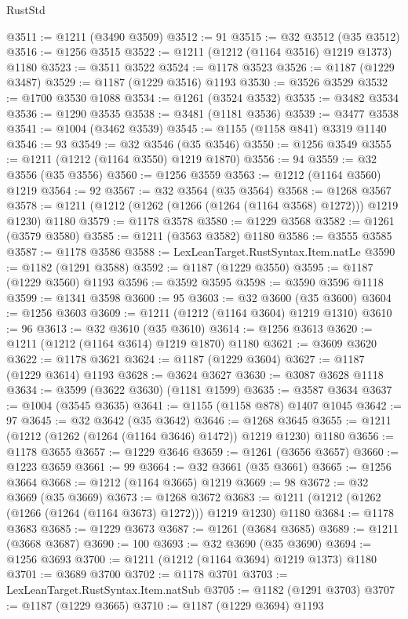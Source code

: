 \begin{lexlean}{RustStd}
\begin{coremodule}
{\begin{coremodule}
{{{{{{{{{{{{{{{{{{{{{{{{{{{{{{{{@3511 := @1211 (@3490 @3509)
@3512 := 91
@3515 := @32 @3512 (@35 @3512)
@3516 := @1256 @3515
@3522 := @1211 (@1212 (@1164 @3516) @1219 @1373) @1180
@3523 := @3511 @3522
@3524 := @1178 @3523
@3526 := @1187 (@1229 @3487)
@3529 := @1187 (@1229 @3516) @1193
@3530 := @3526 @3529
@3532 := @1700 @3530 @1088
@3534 := @1261 (@3524 @3532)
@3535 := @3482 @3534
@3536 := @1290 @3535
@3538 := @3481 (@1181 @3536)
@3539 := @3477 @3538
@3541 := @1004 (@3462 @3539)
@3545 := @1155 (@1158 @841) @3319 @1140
@3546 := 93
@3549 := @32 @3546 (@35 @3546)
@3550 := @1256 @3549
@3555 := @1211 (@1212 (@1164 @3550) @1219 @1870)
@3556 := 94
@3559 := @32 @3556 (@35 @3556)
@3560 := @1256 @3559
@3563 := @1212 (@1164 @3560) @1219
@3564 := 92
@3567 := @32 @3564 (@35 @3564)
@3568 := @1268 @3567
@3578 := @1211 (@1212 (@1262 (@1266 (@1264 (@1164 @3568) @1272))) @1219 @1230) @1180
@3579 := @1178 @3578
@3580 := @1229 @3568
@3582 := @1261 (@3579 @3580)
@3585 := @1211 (@3563 @3582) @1180
@3586 := @3555 @3585
@3587 := @1178 @3586
@3588 := LexLeanTarget.RustSyntax.Item.natLe
@3590 := @1182 (@1291 @3588)
@3592 := @1187 (@1229 @3550)
@3595 := @1187 (@1229 @3560) @1193
@3596 := @3592 @3595
@3598 := @3590 @3596 @1118
@3599 := @1341 @3598
@3600 := 95
@3603 := @32 @3600 (@35 @3600)
@3604 := @1256 @3603
@3609 := @1211 (@1212 (@1164 @3604) @1219 @1310)
@3610 := 96
@3613 := @32 @3610 (@35 @3610)
@3614 := @1256 @3613
@3620 := @1211 (@1212 (@1164 @3614) @1219 @1870) @1180
@3621 := @3609 @3620
@3622 := @1178 @3621
@3624 := @1187 (@1229 @3604)
@3627 := @1187 (@1229 @3614) @1193
@3628 := @3624 @3627
@3630 := @3087 @3628 @1118
@3634 := @3599 (@3622 @3630) (@1181 @1599)
@3635 := @3587 @3634
@3637 := @1004 (@3545 @3635)
@3641 := @1155 (@1158 @878) @1407 @1045
@3642 := 97
@3645 := @32 @3642 (@35 @3642)
@3646 := @1268 @3645
@3655 := @1211 (@1212 (@1262 (@1264 (@1164 @3646) @1472)) @1219 @1230) @1180
@3656 := @1178 @3655
@3657 := @1229 @3646
@3659 := @1261 (@3656 @3657)
@3660 := @1223 @3659
@3661 := 99
@3664 := @32 @3661 (@35 @3661)
@3665 := @1256 @3664
@3668 := @1212 (@1164 @3665) @1219
@3669 := 98
@3672 := @32 @3669 (@35 @3669)
@3673 := @1268 @3672
@3683 := @1211 (@1212 (@1262 (@1266 (@1264 (@1164 @3673) @1272))) @1219 @1230) @1180
@3684 := @1178 @3683
@3685 := @1229 @3673
@3687 := @1261 (@3684 @3685)
@3689 := @1211 (@3668 @3687)
@3690 := 100
@3693 := @32 @3690 (@35 @3690)
@3694 := @1256 @3693
@3700 := @1211 (@1212 (@1164 @3694) @1219 @1373) @1180
@3701 := @3689 @3700
@3702 := @1178 @3701
@3703 := LexLeanTarget.RustSyntax.Item.natSub
@3705 := @1182 (@1291 @3703)
@3707 := @1187 (@1229 @3665)
@3710 := @1187 (@1229 @3694) @1193
}}}}}}}}}}}}}}}}}}}}}}}}}}}}}}}}
\end{coremodule}}
\end{coremodule}
\end{lexlean}
